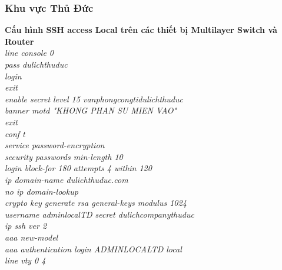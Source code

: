\documentclass[a4paper, 12pt]{article}
\begin{document}
\subsubsection{Khu vực Thủ Đức}
\hspace*{1cm} \textbf{Cấu hình SSH access Local trên các thiết bị Multilayer Switch và Router}\\
\hspace*{2cm}\textit{line console 0\\
\hspace*{2cm}pass dulichthuduc\\
\hspace*{2cm}login\\
\hspace*{2cm}exit\\
\hspace*{2cm}enable secret level 15 vanphongcongtidulichthuduc\\
\hspace*{2cm}banner motd "KHONG PHAN SU MIEN VAO"\\
\hspace*{2cm}exit\\
\hspace*{2cm}conf t\\
\hspace*{2cm}service password-encryption\\
\hspace*{2cm}security passwords min-length 10\\
\hspace*{2cm}login block-for 180 attempts 4 within 120\\
\hspace*{2cm}ip domain-name dulichthuduc.com\\
\hspace*{2cm}no ip domain-lookup\\
\hspace*{2cm}crypto key generate rsa general-keys modulus 1024\\
\hspace*{2cm}username adminlocalTD secret dulichcompanythuduc\\
\hspace*{2cm}ip ssh ver 2\\
\hspace*{2cm}aaa new-model\\
\hspace*{2cm}aaa authentication login ADMINLOCALTD local\\
\hspace*{2cm}line vty 0 4\\
}
\end{document}
